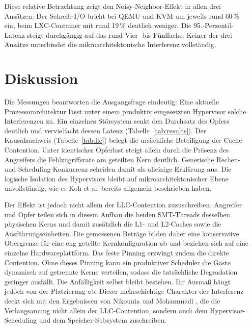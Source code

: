 \documentclass[conference]{IEEEtran}
\begin{document}
Diese relative Betrachtung zeigt den Noisy-Neighbor-Effekt in allen drei Ansätzen: Der Schreib-I/O bricht bei QEMU und KVM um jeweils rund 60\,\% ein, beim LXC-Container mit rund 19\,\% deutlich weniger. Die 95.-Perzentil-Latenz steigt durchgängig auf das rund Vier- bis Fünffache. Keiner der drei Ansätze unterbindet die mikroarchitektonische Interferenz vollständig.

\section{Diskussion}
Die Messungen beantworten die Ausgangsfrage eindeutig: Eine aktuelle Prozessorarchitektur lässt unter einem produktiv eingesetzten Hypervisor solche Interferenzen zu. Ein einzelnes Störsystem senkt den Durchsatz des Opfers deutlich und vervielfacht dessen Latenz (Tabelle~\ref{tab:results}). Der Kausalnachweis (Tabelle~\ref{tab:llc}) belegt die ursächliche Beteiligung der Cache-Contention. Unter identischer Opferlast steigt allein durch die Präsenz des Angreifers die Fehlzugriffsrate am geteilten Kern deutlich. Generische Rechen- und Scheduling-Konkurrenz scheiden damit als alleinige Erklärung aus. Die logische Isolation des Hypervisors bleibt auf mikroarchitektonischer Ebene unvollständig, wie es Koh et al. \cite{koh2007analysis} bereits allgemein beschrieben haben.

Der Effekt ist jedoch nicht allein der LLC-Contention zuzuschreiben. Angreifer und Opfer teilen sich in diesem Aufbau die beiden SMT-Threads desselben physischen Kerns und damit zusätzlich die L1- und L2-Caches sowie die Ausführungseinheiten. Die gemessenen Beträge bilden daher eine konservative Obergrenze für eine eng geteilte Kernkonfiguration ab und beziehen sich auf eine einzelne Hardwareplattform. Das feste Pinning erzwingt zudem die direkte Contention. Ohne dieses Pinning kann ein produktiver Scheduler die Gäste dynamisch auf getrennte Kerne verteilen, sodass die tatsächliche Degradation geringer ausfällt. Die Anfälligkeit selbst bleibt bestehen. Ihr Ausmaß hängt jedoch von der Platzierung ab. Dieser mehrschichtige Charakter der Interferenz deckt sich mit den Ergebnissen von Nikounia und Mohammadi \cite{nikounia2018hypervisor}, die die Verlangsamung nicht allein der LLC-Contention, sondern auch dem Hypervisor-Scheduling und dem Speicher-Subsystem zuschreiben.
\end{document}
